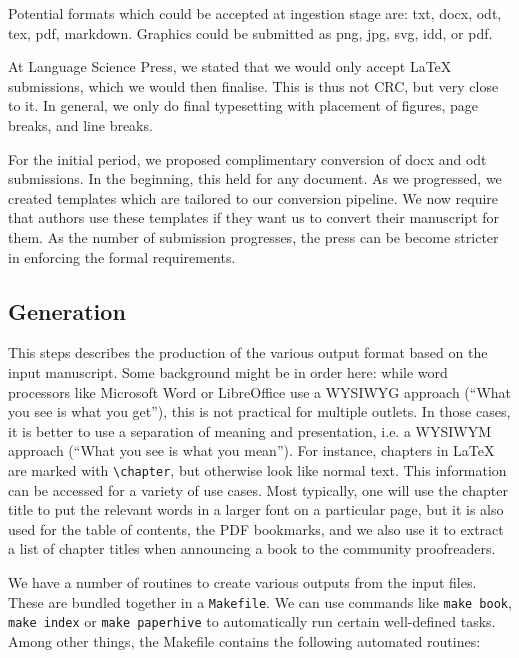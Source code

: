 \documentclass[nonflat,modfonts,output=book] {langsci/langscibook}
\begin{document}
Potential formats which could be accepted at ingestion stage are: txt, docx, odt, tex, pdf, markdown. Graphics could be submitted as png, jpg, svg, idd, or pdf. 


At Language Science Press, we stated that we would only accept \LaTeX\xspace submissions, which we would then finalise. This is thus not CRC, but very close to it. In general, we only do final typesetting with placement of figures, page breaks, and line breaks. 

For the initial period, we proposed complimentary conversion of docx and odt submissions. In the beginning, this held for any document. As we progressed, we created templates which are tailored to our conversion pipeline. We now require that authors use these templates if they want us to convert their manuscript for them. As the number of submission progresses, the press can be become stricter in enforcing the formal requirements. 


\subsection{Generation}
This steps describes the production of the various output format based on the input manuscript. Some background might be in order here: while word processors like Microsoft Word or LibreOffice use a WYSIWYG approach (``What you see is what you get''), this is not practical for multiple outlets.
In those cases, it is better to use a separation of meaning and presentation, i.e. a WYSIWYM approach (``What you see is what you mean''). For instance, chapters in \LaTeX\xspace are marked with \verb+\chapter+, but otherwise look like normal text. This information can be accessed for a variety of use cases. Most typically, one will use the chapter title to put the relevant words in a larger font on a particular  page, but it is also used for the table of contents, the PDF bookmarks, and we also use it to extract a list of chapter titles when announcing a book to the community proofreaders. 

We have a number of routines to create various outputs from the input files. These are bundled together in a \verb+Makefile+. We can use commands like \verb+make book+, \verb+make index+ or \verb+make paperhive+ to automatically run certain well-defined tasks. Among other things, the Makefile contains the following automated routines: 
\end{document}
